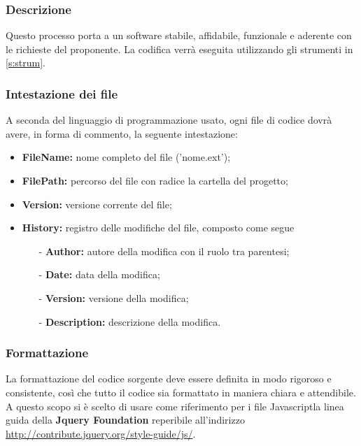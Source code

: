 \documentclass[a4paper,11pt]{article}
\begin{document}
			\subsubsection{Descrizione}		
				Questo processo porta a un software stabile, affidabile, funzionale e aderente con le richieste del proponente. La codifica verrà eseguita utilizzando gli strumenti in \ref{s:strum}.
			
			\subsubsection{Intestazione dei file}		
			A seconda del linguaggio di programmazione usato, ogni file di codice dovrà avere, in forma di commento, la seguente intestazione:		
			
		\begin{itemize}
		\item \textbf{FileName:} nome completo del file ('nome.ext');
		\item \textbf{FilePath:} percorso del file con radice la cartella del progetto;
		\item \textbf{Version:} versione corrente del file;
		\item \textbf{History:} registro delle modifiche del file, composto come segue 
			\begin{itemize}
			\item[-] \textbf{Author:} autore della modifica con il ruolo tra parentesi;
			\item[-] \textbf{Date:} data della modifica;
			\item[-] \textbf{Version:} versione della modifica;
			\item[-] \textbf{Description:} descrizione della modifica.
			\end{itemize}	
		\end{itemize}
		
		\subsubsection{Formattazione}
		La formattazione del codice sorgente deve essere definita in modo rigoroso e consistente, così
che tutto il codice sia formattato in maniera chiara e attendibile. A questo scopo si è scelto di usare come riferimento per i file Javascript\addglos  la linea guida della \textbf{Jquery Foundation} reperibile all'indirizzo \url{http://contribute.jquery.org/style-guide/js/}.
\end{document}

